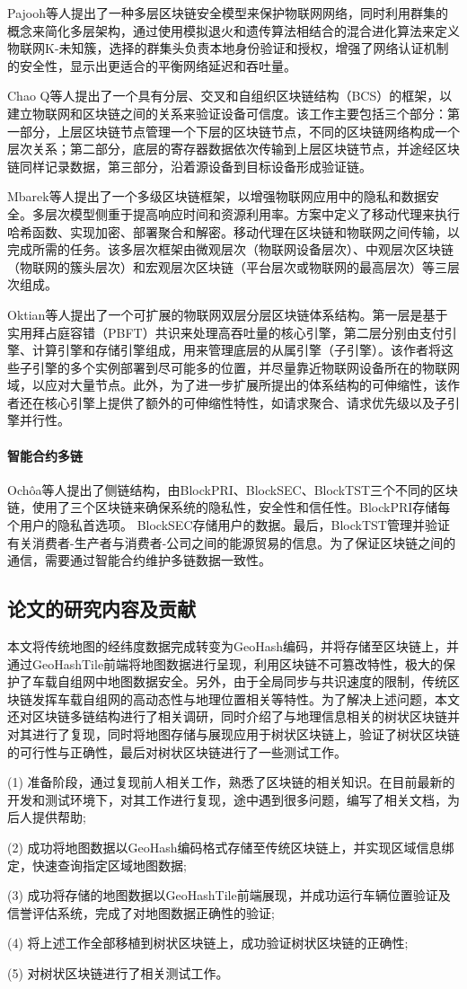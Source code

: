 Pajooh等人\cite{honar2021multi}提出了一种多层区块链安全模型来保护物联网网络，同时利用群集的概念来简化多层架构，通过使用模拟退火和遗传算法相结合的混合进化算法来定义物联网K-未知簇，选择的群集头负责本地身份验证和授权，增强了网络认证机制的安全性，显示出更适合的平衡网络延迟和吞吐量。

Chao Q等人\cite{qu2018blockchain}提出了一个具有分层、交叉和自组织区块链结构（BCS）的框架，以建立物联网和区块链之间的关系来验证设备可信度。该工作主要包括三个部分：第一部分，上层区块链节点管理一个下层的区块链节点，不同的区块链网络构成一个层次关系；第二部分，底层的寄存器数据依次传输到上层区块链节点，并途经区块链同样记录数据，第三部分，沿着源设备到目标设备形成验证链。

Mbarek等人\cite{mbarek2019mbs}提出了一个多级区块链框架，以增强物联网应用中的隐私和数据安全。多层次模型侧重于提高响应时间和资源利用率。方案中定义了移动代理来执行哈希函数、实现加密、部署聚合和解密。移动代理在区块链和物联网之间传输，以完成所需的任务。该多层次框架由微观层次（物联网设备层次）、中观层次区块链（物联网的簇头层次）和宏观层次区块链（平台层次或物联网的最高层次）等三层次组成。

Oktian等人\cite{oktian2020hierarchical}提出了一个可扩展的物联网双层分层区块链体系结构。第一层是基于实用拜占庭容错（PBFT）共识来处理高吞吐量的核心引擎，第二层分别由支付引擎、计算引擎和存储引擎组成，用来管理底层的从属引擎（子引擎）。该作者将这些子引擎的多个实例部署到尽可能多的位置，并尽量靠近物联网设备所在的物联网域，以应对大量节点。此外，为了进一步扩展所提出的体系结构的可伸缩性，该作者还在核心引擎上提供了额外的可伸缩性特性，如请求聚合、请求优先级以及子引擎并行性。

\paragraph{智能合约多链}
Ochôa等人\cite{sestrem2020cost}提出了侧链结构，由BlockPRI、BlockSEC、BlockTST三个不同的区块链，使用了三个区块链来确保系统的隐私性，安全性和信任性。BlockPRI存储每个用户的隐私首选项。 BlockSEC存储用户的数据。最后，BlockTST管理并验证有关消费者-生产者与消费者-公司之间的能源贸易的信息。为了保证区块链之间的通信，需要通过智能合约维护多链数据一致性。

\subsection{论文的研究内容及贡献}
本文将传统地图的经纬度数据完成转变为GeoHash编码，并将存储至区块链上，并通过GeoHashTile前端将地图数据进行呈现，利用区块链不可篡改特性，极大的保护了车载自组网中地图数据安全。另外，由于全局同步与共识速度的限制，传统区块链发挥车载自组网的高动态性与地理位置相关等特性。为了解决上述问题，本文还对区块链多链结构进行了相关调研，同时介绍了与地理信息相关的树状区块链并对其进行了复现，同时将地图存储与展现应用于树状区块链上，验证了树状区块链的可行性与正确性，最后对树状区块链进行了一些测试工作。

(1) 准备阶段，通过复现前人相关工作，熟悉了区块链的相关知识。在目前最新的开发和测试环境下，对其工作进行复现，途中遇到很多问题，编写了相关文档，为后人提供帮助;

(2)  成功将地图数据以GeoHash编码格式存储至传统区块链上，并实现区域信息绑定，快速查询指定区域地图数据;

(3) 成功将存储的地图数据以GeoHashTile前端展现，并成功运行车辆位置验证及信誉评估系统，完成了对地图数据正确性的验证;

(4) 将上述工作全部移植到树状区块链上，成功验证树状区块链的正确性;

(5) 对树状区块链进行了相关测试工作。